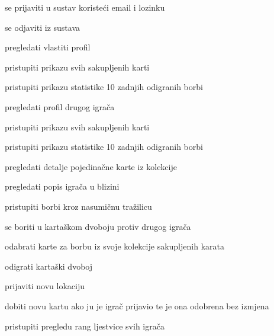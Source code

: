 \begin{packed_enum}
\begin{packed_enum}
					\item se prijaviti u sustav koristeći email i lozinku
					\item se odjaviti iz sustava
					\item pregledati vlastiti profil
					\begin{packed_enum}
						\item pristupiti prikazu svih sakupljenih karti
						\item pristupiti prikazu statistike 10 zadnjih odigranih borbi
					\end{packed_enum}
				\item pregledati profil drugog igrača
				\begin{packed_enum}
					\item pristupiti prikazu svih sakupljenih karti
					\item pristupiti prikazu statistike 10 zadnjih odigranih borbi
				\end{packed_enum}
			\item pregledati detalje pojedinačne karte iz kolekcije
			\item pregledati popis igrača u blizini
			\item pristupiti borbi kroz nasumičnu tražilicu
			\item se boriti u kartaškom dvoboju protiv drugog igrača
			\begin{packed_enum}
				\item odabrati karte za borbu iz svoje kolekcije sakupljenih karata
				\item odigrati kartaški dvoboj
			\end{packed_enum}
		\item prijaviti novu lokaciju
		\item dobiti novu kartu ako ju je igrač prijavio te je ona odobrena bez izmjena
		\item pristupiti pregledu rang ljestvice svih igrača
					
				\end{packed_enum}
			\item  {}
			

\end{packed_enum}
